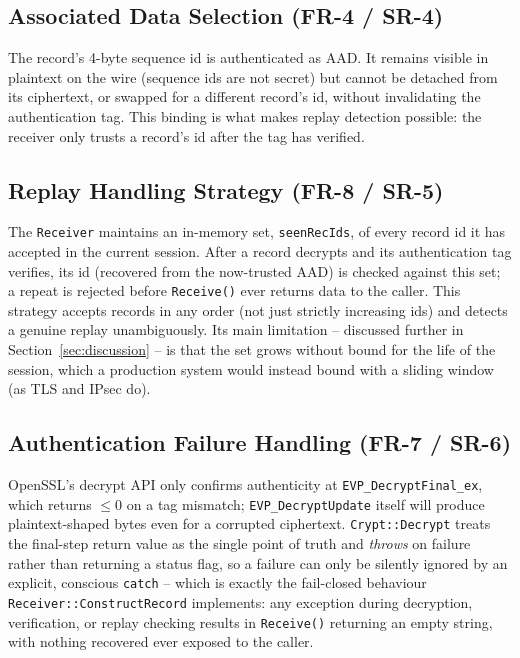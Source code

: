 \documentclass[11pt]{article}
\begin{document}
\subsection{Associated Data Selection (FR-4 / SR-4)}

The record's 4-byte sequence id is authenticated as AAD. It remains visible in
plaintext on the wire (sequence ids are not secret) but cannot be detached from its
ciphertext, or swapped for a different record's id, without invalidating the
authentication tag. This binding is what makes replay detection possible: the receiver
only trusts a record's id after the tag has verified.

\subsection{Replay Handling Strategy (FR-8 / SR-5)}

The \texttt{Receiver} maintains an in-memory set, \texttt{seenRecIds}, of every record
id it has accepted in the current session. After a record decrypts and its
authentication tag verifies, its id (recovered from the now-trusted AAD) is checked
against this set; a repeat is rejected before \texttt{Receive()} ever returns data to
the caller. This strategy accepts records in any order (not just strictly increasing
ids) and detects a genuine replay unambiguously. Its main limitation -- discussed
further in Section~\ref{sec:discussion} -- is that the set grows without bound for the
life of the session, which a production system would instead bound with a sliding
window (as TLS and IPsec do).

\subsection{Authentication Failure Handling (FR-7 / SR-6)}

OpenSSL's decrypt API only confirms authenticity at \texttt{EVP\_DecryptFinal\_ex},
which returns $\leq 0$ on a tag mismatch; \texttt{EVP\_DecryptUpdate} itself will
produce plaintext-shaped bytes even for a corrupted ciphertext. \texttt{Crypt::Decrypt}
treats the final-step return value as the single point of truth and \emph{throws} on
failure rather than returning a status flag, so a failure can only be silently ignored
by an explicit, conscious \texttt{catch} -- which is exactly the fail-closed behaviour
\texttt{Receiver::ConstructRecord} implements: any exception during decryption,
verification, or replay checking results in \texttt{Receive()} returning an empty
string, with nothing recovered ever exposed to the caller.
\end{document}

